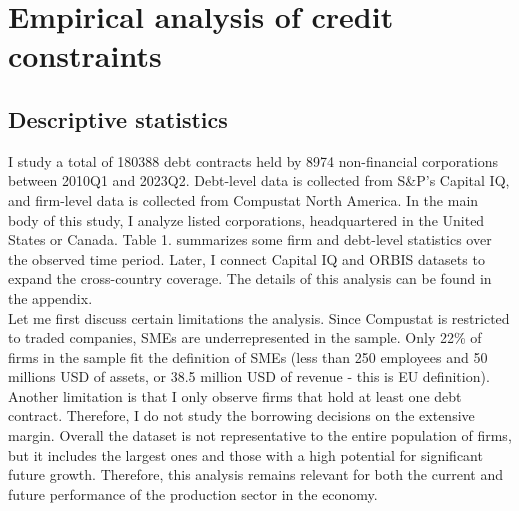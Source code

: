 \documentclass[12pt]{article}
\begin{document}
\section{Empirical analysis of credit constraints \label{sec:quantitative analysis}}
\subsection{Descriptive statistics \label{sec:descriptive stats}}

I study a total of 180388 debt contracts held by 8974 non-financial corporations between 2010Q1 and 2023Q2. Debt-level data is collected from S\&P's Capital IQ, and firm-level data is collected from Compustat North America. In the main body of this study, I analyze listed corporations, headquartered in the United States or Canada. Table 1. summarizes some firm and debt-level statistics over the observed time period. Later, I connect Capital IQ and ORBIS datasets to expand the cross-country coverage. The details of this analysis can be found in the appendix. \vspace{3mm} \\ 
Let me first discuss certain limitations the analysis. Since Compustat is restricted to traded companies, SMEs are underrepresented in the sample. Only 22\% of firms in the sample fit the definition of SMEs (less than 250 employees and 50 millions USD of assets, or 38.5 million USD of revenue - this is EU definition). Another limitation is that I only observe firms that hold at least one debt contract. Therefore, I do not study the borrowing decisions on the extensive margin. Overall the dataset is not representative to the entire population of firms, but it includes the largest ones and those with a high potential for significant future growth.  Therefore, this analysis remains relevant for both the current and future performance of the production sector in the economy.
\end{document}

